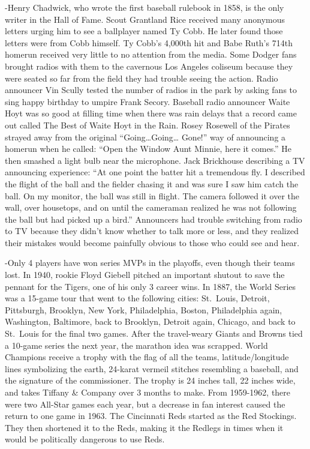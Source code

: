 \documentclass[
]{article}
\begin{document}
-Henry Chadwick, who wrote the first baseball rulebook in 1858, is the
only writer in the Hall of Fame. Scout Grantland Rice received many
anonymous letters urging him to see a ballplayer named Ty Cobb. He later
found those letters were from Cobb himself. Ty Cobb's 4,000th hit and
Babe Ruth's 714th homerun received very little to no attention from the
media. Some Dodger fans brought radios with them to the cavernous Los
Angeles coliseum because they were seated so far from the field they had
trouble seeing the action. Radio announcer Vin Scully tested the number
of radios in the park by asking fans to sing happy birthday to umpire
Frank Secory. Baseball radio announcer Waite Hoyt was so good at filling
time when there was rain delays that a record came out called The Best
of Waite Hoyt in the Rain. Rosey Rosewell of the Pirates strayed away
from the original ``Going\ldots Going\ldots{} Gone!'' way of announcing
a homerun when he called: ``Open the Window Aunt Minnie, here it
comes.'' He then smashed a light bulb near the microphone. Jack
Brickhouse describing a TV announcing experience: ``At one point the
batter hit a tremendous fly. I described the flight of the ball and the
fielder chasing it and was sure I saw him catch the ball. On my monitor,
the ball was still in flight. The camera followed it over the wall, over
housetops, and on until the cameraman realized he was not following the
ball but had picked up a bird.'' Announcers had trouble switching from
radio to TV because they didn't know whether to talk more or less, and
they realized their mistakes would become painfully obvious to those who
could see and hear.

-Only 4 players have won series MVPs in the playoffs, even though their
teams lost. In 1940, rookie Floyd Giebell pitched an important shutout
to save the pennant for the Tigers, one of his only 3 career wins. In
1887, the World Series was a 15-game tour that went to the following
cities: St.~Louis, Detroit, Pittsburgh, Brooklyn, New York,
Philadelphia, Boston, Philadelphia again, Washington, Baltimore, back to
Brooklyn, Detroit again, Chicago, and back to St.~Louis for the final
two games. After the travel-weary Giants and Browns tied a 10-game
series the next year, the marathon idea was scrapped. World Champions
receive a trophy with the flag of all the teams, latitude/longitude
lines symbolizing the earth, 24-karat vermeil stitches resembling a
baseball, and the signature of the commissioner. The trophy is 24 inches
tall, 22 inches wide, and takes Tiffany \& Company over 3 months to
make. From 1959-1962, there were two All-Star games each year, but a
decrease in fan interest caused the return to one game in 1963. The
Cincinnati Reds started as the Red Stockings. They then shortened it to
the Reds, making it the Redlegs in times when it would be politically
dangerous to use Reds.
\end{document}
